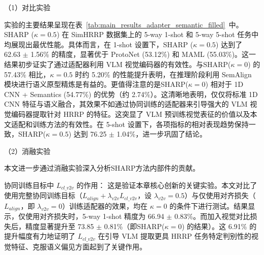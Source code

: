 （1）对比实验

实验的主要结果呈现在表~\ref{tab:main_results_adapter_semantic_filled}~中。SHARP ($\kappa=0.5$) 在 SimHRRP 数据集上的 5-way 1-shot 和 5-way 5-shot 任务中均展现出最优性能。具体而言，在 1-shot 设置下，SHARP ($\kappa=0.5$) 达到了 62.63 $\pm$ 1.56\% 的精度，显著优于 ProtoNet (53.12\%) 和 MAML (55.03\%)。这一结果初步证实了通过适配器利用 VLM 视觉编码器的有效性。与SHARP($\kappa=0$) 的 57.43\% 相比，$\kappa=0.5$ 时约 5.20\% 的性能提升表明，在推理阶段利用 SemAlign 模块进行语义原型精炼是有益的。更值得注意的是SHARP($\kappa=0$) 相对于 1D CNN + Semantics (54.77\%) 的优势（约 2.74\%）。这清晰地表明，仅仅将标准 1D CNN 特征与语义融合，其效果不如通过协同训练的适配器来引导强大的 VLM 视觉编码器提取针对 HRRP 的特征。这突显了 VLM 预训练视觉表征的价值以及本文适配和训练方法的有效性。在 5-shot 设置下，各项指标的相对表现趋势保持一致，SHARP($\kappa=0.5$) 达到 76.25 $\pm$ 1.04\%，进一步巩固了结论。

\begin{table}[h!]
\centering
\caption{不同方法在5-way K-shot HRRP 识别任务上的识别准确率对比} \label{tab:main_results_adapter_semantic_filled} %
\end{table}
\captionsetup{skip=5pt}

（2）消融实验

本文进一步通过消融实验深入分析SHARP方法内部件的贡献。

协同训练目标中 $L_{cl\_v2v}$ 的作用： 这是验证本章核心创新的关键实验。本文对比了使用完整协同训练目标（$L_{align} + \lambda_{v2v} L_{cl\_v2v}$，设 $\lambda_{v2v}=0.5$）与仅使用对齐损失（$L_{align}$，即 $\lambda_{v2v}=0$）训练适配器的效果，均在 $\kappa=0$ 的条件下进行测试。结果显示，仅使用对齐损失时，5-way 1-shot 精度为 66.94 $\pm$ 0.83\%。而加入视觉对比损失后，精度显著提升至 73.85 $\pm$ 0.81\%（即SHARP($\kappa=0$) 的结果）。这 6.91\% 的提升幅度有力地证明了 $L_{cl\_v2v}$ 在引导 VLM 提取更具 HRRP 任务特定判别性的视觉特征、克服语义偏见方面起到了关键作用。

